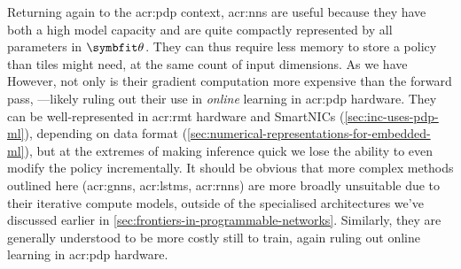 Returning again to the \gls{acr:pdp} context, \glspl{acr:nn} are useful because they have both a high model capacity and are quite compactly represented by all parameters in $\wvec{}$.
They can thus require less memory to store a policy than tiles might need, at the same count of input dimensions.
As we have
However, not only is their gradient computation more expensive than the forward pass, ---likely ruling out their use in \emph{online} learning in \gls{acr:pdp} hardware.
They can be well-represented in \gls{acr:rmt} hardware and SmartNICs (\cref{sec:inc-uses-pdp-ml}), depending on data format (\cref{sec:numerical-representations-for-embedded-ml}), but at the extremes of making inference quick we lose the ability to even modify the policy incrementally.
It should be obvious that more complex methods outlined here (\glspl{acr:gnn}, \glspl{acr:lstm}, \glspl{acr:rnn}) are more broadly unsuitable due to their iterative compute models, outside of the specialised architectures we've discussed earlier in \cref{sec:frontiers-in-programmable-networks}.
Similarly, they are generally understood to be more costly still to train, again ruling out online learning in \gls{acr:pdp} hardware.


